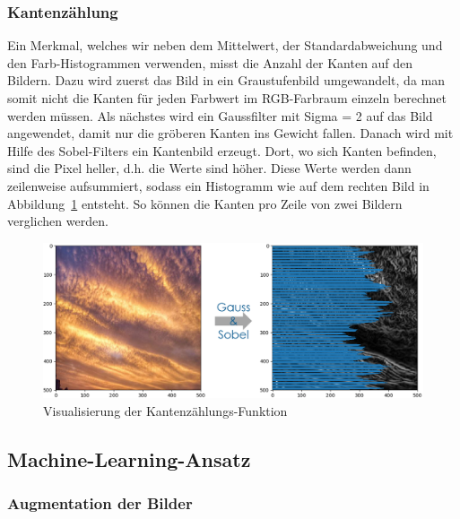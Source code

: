 \documentclass[a4,german]{article}
\begin{document}

\subsubsection{Kantenzählung}
\label{sec:kanten}
Ein Merkmal, welches wir neben dem Mittelwert, der Standardabweichung und den Farb-Histogrammen verwenden, misst die Anzahl der Kanten auf den Bildern.
Dazu wird zuerst das Bild in ein Graustufenbild umgewandelt, da man somit nicht die Kanten für jeden Farbwert im RGB-Farbraum einzeln berechnet werden müssen. Als nächstes wird ein Gaussfilter mit Sigma = 2 auf das Bild angewendet, damit nur die gröberen Kanten ins Gewicht fallen. Danach wird mit Hilfe des Sobel-Filters ein Kantenbild erzeugt.
Dort, wo sich Kanten befinden, sind die Pixel heller, d.h. die Werte sind höher.
Diese Werte werden dann zeilenweise aufsummiert, sodass ein Histogramm wie auf dem rechten Bild in Abbildung~\ref{fig:kaz} entsteht. So können die Kanten pro Zeile von zwei Bildern verglichen werden.

\begin{figure}[h!]
\centering
\includegraphics[width=\textwidth]{Kantenzaehlung.png}
\caption{Visualisierung der Kantenzählungs-Funktion}
    \label{fig:kaz}
\end{figure}


\subsection{Machine-Learning-Ansatz}

\subsubsection{Augmentation der Bilder}
\label{sec:augmentation}
\end{document}
